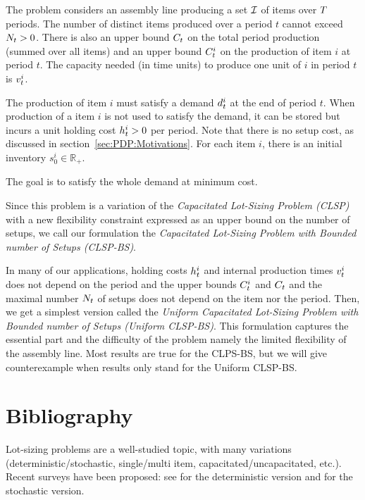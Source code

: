 The problem considers an assembly line producing a set $\mathcal{I}$ of items over $T$ periods. The number of distinct items produced over a period $t$ cannot exceed $N_t>0$. There is also an upper bound $C_t$ on the total period production (summed over all items) and an upper bound $C_t^i$ on the production of item $i$ at period $t$. The capacity needed (in time units) to produce one unit of $i$ in period $t$ is $v_t^i$.

The production of item $i$ must satisfy a demand $d_t^i$ at the end of period $t$. When production of a item $i$ is not used to satisfy the demand, it can be stored but incurs a unit holding cost $h_t^i>0$ per period. Note that there is no setup cost, as discussed in section~\ref{sec:PDP:Motivations}. For each item $i$, there is an initial inventory $s_0^i\in\mathbb{R}_+$.

The goal is to satisfy the whole demand at minimum cost.

Since this problem is a variation of the \emph{Capacitated Lot-Sizing Problem (CLSP)} with a new flexibility constraint expressed as an upper bound on the number of setups, we call our formulation the \emph{Capacitated Lot-Sizing Problem with Bounded number of Setups (CLSP-BS)}.

In many of our applications, holding costs $h_t^i$ and internal production times $v_t^i$ does not depend on the period and the upper bounds $C_t^i$ and $C_t$ and the maximal number $N_t$ of setups does not depend on the item nor the period. Then, we get a simplest version called the \emph{Uniform Capacitated Lot-Sizing Problem with Bounded number of Setups (Uniform CLSP-BS)}. This formulation captures the essential part and the difficulty of the problem namely the limited flexibility of the assembly line. Most results are true for the CLPS-BS, but we will give counterexample when results only stand for the Uniform CLSP-BS.




\section{Bibliography}


Lot-sizing problems are a well-studied topic, with many variations (deterministic/stochastic, single/multi item, capacitated/uncapacitated, etc.). Recent surveys have been proposed: see \cite{Gicquel2008,quadt2008capacitated} for the deterministic version and \cite{Mula2006,Aloulou2014,Diaz-Madronero2014} for the stochastic version.

